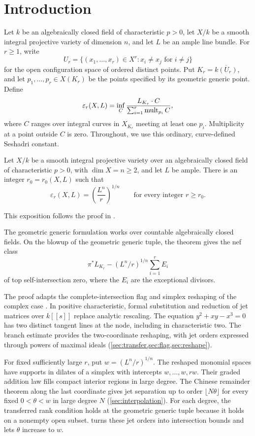 \section{Introduction}\label{sec:introduction}

Let $k$ be an algebraically closed field of characteristic $p>0$, let $X/k$ be a smooth integral projective variety of dimension $n$, and let $L$ be an ample line bundle. For $r\ge1$, write
\[
 U_r=\{(x_1,\ldots,x_r)\in X^r:x_i\ne x_j\text{ for }i\ne j\}
\]
for the open configuration space of ordered distinct points. Put $K_r=\overline{k(U_r)}$, and let $p_1,\ldots,p_r\in X(K_r)$ be the points specified by its geometric generic point. Define
\begin{equation}\label{eq:generic-seshadri}
 \varepsilon_r(X,L)=\inf_C
 \frac{L_{K_r}\cdot C}{\sum_{i=1}^r\operatorname{mult}_{p_i}C},
\end{equation}
where $C$ ranges over integral curves in $X_{K_r}$ meeting at least one $p_i$. Multiplicity at a point outside $C$ is zero. Throughout, we use this ordinary, curve-defined Seshadri constant.

\begin{maintheorem}\label{thm:main}
Let $X/k$ be a smooth integral projective variety over an algebraically closed field of characteristic $p>0$, with $\dim X=n\ge2$, and let $L$ be ample. There is an integer $r_0=r_0(X,L)$ such that
\[
 \varepsilon_r(X,L)=\left(\frac{L^n}{r}\right)^{1/n}
 \qquad\text{for every integer }r\ge r_0.
\]
\end{maintheorem}

This exposition follows the proof in \cite{OpenAIMathSource}.


The geometric generic formulation works over countable algebraically closed fields. On the blowup of the geometric generic tuple, the theorem gives the nef class
\[
 \pi^*L_{K_r}-(L^n/r)^{1/n}\sum_{i=1}^r E_i
\]
of top self-intersection zero, where the $E_i$ are the exceptional divisors.

The proof adapts the complete-intersection flag and simplex reshaping of the complex case \cite[Sections~2--6]{OpenAI2026Higher}. In positive characteristic, formal substitution and reduction of jet matrices over $k[[s]]$ replace analytic rescaling. The equation $y^2+xy-x^3=0$ has two distinct tangent lines at the node, including in characteristic two. The branch estimate provides the two-coordinate reshaping, with jet orders expressed through powers of maximal ideals (\cref{sec:transfer,sec:flag,sec:reshape}).

For fixed sufficiently large $r$, put $w=(L^n/r)^{1/n}$. The reshaped monomial spaces have supports in dilates of a simplex with intercepts $w,\ldots,w,rw$. Their graded addition law fills compact interior regions in large degree. The Chinese remainder theorem along the last coordinate gives jet separation up to order $\lfloor N\theta\rfloor$ for every fixed $0<\theta<w$ in large degree $N$ (\cref{sec:interpolation}). For each degree, the transferred rank condition holds at the geometric generic tuple because it holds on a nonempty open subset.  turns these jet orders into intersection bounds and lets $\theta$ increase to $w$.
